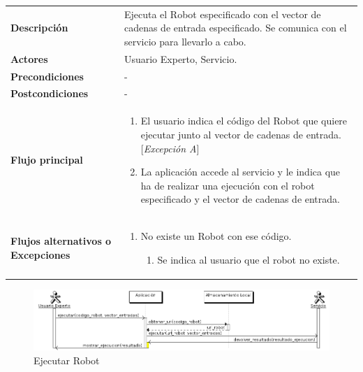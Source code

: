 \begin{tabular}[h]{ p{ } p{ }}

\textbf{Descripción} & Ejecuta el Robot especificado con el vector de
cadenas de entrada especificado. Se comunica con el servicio para
llevarlo a cabo.\\[3mm]

\textbf{Actores} & Usuario Experto, Servicio.\\[3mm]

\textbf{Precondiciones} & - \\[3mm]

\textbf{Postcondiciones} & - \\[3mm]

\textbf{Flujo principal} & \begin{enumerate}[leftmargin=1em,topsep=0pt, partopsep=0pt]
  \item El usuario indica el código del Robot que quiere ejecutar
    junto al vector de cadenas de entrada. [\emph{Excepción A}]
  \item La aplicación accede al servicio y le indica que ha de
    realizar una ejecución con el robot especificado y el vector de
    cadenas de entrada.
\end{enumerate}\\[3mm]

\textbf{Flujos alternativos o Excepciones} &
\begin{enumerate}[label=\Alph*:,leftmargin=1em,topsep=0pt, partopsep=0pt]
\item No existe un Robot con ese código.
  \begin{enumerate}[label=\arabic*.,topsep=0pt, partopsep=0pt]
    \item Se indica al usuario que el robot no existe.
  \end{enumerate}
\end{enumerate}\\[3mm]
\end{tabular}

\begin{figure}[bp!]
  \includegraphics[width=1\textwidth]{chapters/technical-manual/diagrams/sequence/expert_user/ejecutar_robot.png}
\caption{Ejecutar Robot}
\end{figure}
\clearpage
